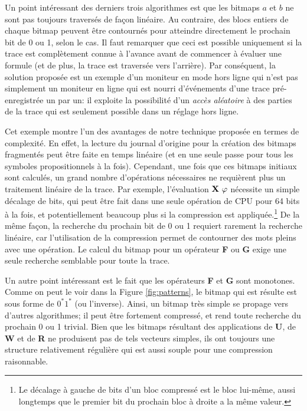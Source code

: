 Un point intéressant des derniers trois algorithmes est que les bitmaps $a$ et $b$ ne sont pas toujours traversés de façon linéaire. Au contraire, des blocs entiers de chaque bitmap peuvent être contournés pour atteindre directement le prochain bit de 0 ou 1, selon le cas. Il faut remarquer que ceci est possible uniquement si la trace est complètement connue à l'avance avant de commencer à évaluer une formule (et de plus, la trace est traversée vers l'arrière). Par conséquent, la solution proposée est un exemple d'un moniteur en mode hors ligne qui n'est pas simplement un moniteur en ligne qui est nourri d'événements d'une trace pré-enregistrée un par un: il exploite la possibilité d'un \emph{accès aléatoire} à des parties de la trace qui est seulement possible dans un réglage hors ligne.

Cet exemple montre l'un des avantages de notre technique proposée en termes de complexité. En effet, la lecture du journal d'origine pour la création des bitmaps fragmentés peut être faite en temps linéaire (et en une seule passe pour tous les symboles propositionnels à la fois). Cependant, une fois que ces bitmaps initiaux sont calculés, un grand nombre d'opérations nécessaires ne requièrent plus un traitement linéaire de la trace. Par exemple, l'évaluation $\mathop{\mbox{\textbf{X}}}\,\varphi$ nécessite un simple décalage de bits, qui peut être fait dans une seule opération de CPU pour 64 bits à la fois, et potentiellement beaucoup plus si la compression est appliquée.\footnote{Le décalage à gauche de bits d'un bloc compressé est le bloc lui-même, aussi longtemps que le premier bit du prochain bloc à droite a la même valeur.} De la même façon, la recherche du prochain bit de 0 ou 1 requiert rarement la recherche linéaire, car l'utilisation de la compression permet de contourner des mots pleins avec une opération. Le calcul du bitmap pour un opérateur \textbf{F} ou \textbf{G} exige une seule recherche semblable pour toute la trace.

Un autre point intéressant est le fait que les opérateurs \textbf{F} et \textbf{G} sont monotones. Comme on peut le voir dans la Figure \ref{fig:patterns}, le bitmap qui est résulte est sous forme de $0^*1^*$ (ou l'inverse). Ainsi, un bitmap très simple se propage vers d'autres algorithmes; il peut être fortement compressé, et rend toute recherche du prochain 0 ou 1 trivial. Bien que les bitmaps résultant des applications de \textbf{U}, de \textbf{W} et de \textbf{R} ne produisent pas de tels vecteurs simples, ils ont toujours une structure relativement régulière qui est aussi souple pour une compression raisonnable.

